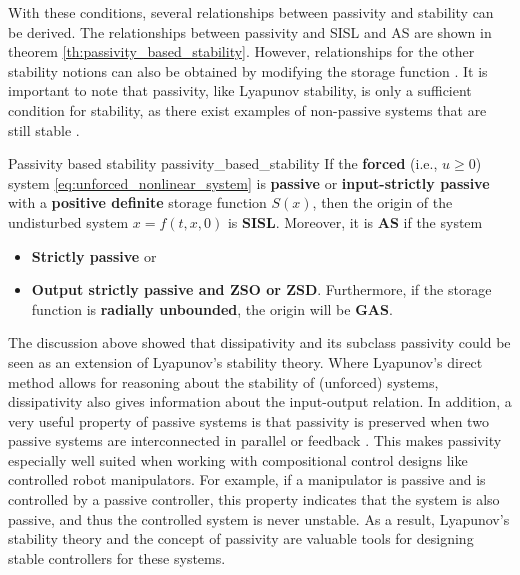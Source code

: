 With these conditions, several relationships between passivity and stability can be derived. The relationships between passivity and SISL and AS are shown in theorem \ref{th:passivity_based_stability}. However, relationships for the other stability notions can also be obtained by modifying the storage function \cite{haddadNonlinearDynamicalSystems2011}. It is important to note that passivity, like Lyapunov stability, is only a sufficient condition for stability, as there exist examples of non-passive systems that are still stable \cite{ngwompoPassivityAnalysisLinear2017}.
\begin{theorem}[list text=Passivity based stability,after pre=\footnotetext{Lemma 5.5-5.6 of \cite{khalilNonlinearControl2015} were combined and slightly adjusted for clarity.}]{Passivity based stability \cite{khalilNonlinearSystems2002}\footnotemark}{passivity_based_stability}
  If the \textbf{forced} (i.e., $u \ge 0$) system \eqref{eq:unforced_nonlinear_system} is \textbf{passive} or \textbf{input-strictly passive} with a \textbf{positive definite} storage function $S\left(x\right)$, then the origin of the undisturbed system $x=f\left(t, x, 0\right)$ is \textbf{SISL}. Moreover, it is \textbf{AS} if the system
  \begin{itemize}
    \item \textbf{Strictly passive} or
    \item \textbf{Output strictly passive and ZSO or ZSD}.
          Furthermore, if the storage function is \textbf{radially unbounded}, the origin will be \textbf{GAS}.
  \end{itemize}
\end{theorem}
The discussion above showed that dissipativity and its subclass passivity could be seen as an extension of Lyapunov's stability theory. Where Lyapunov's direct method allows for reasoning about the stability of (unforced) systems, dissipativity also gives information about the input-output relation. In addition, a very useful property of passive systems is that passivity is preserved when two passive systems are interconnected in parallel or feedback \cite{haddadNonlinearDynamicalSystems2011}. This makes passivity especially well suited when working with compositional control designs like controlled robot manipulators. For example, if a manipulator is passive and is controlled by a passive controller, this property indicates that the system is also passive, and thus the controlled system is never unstable. As a result, Lyapunov's stability theory and the concept of passivity are valuable tools for designing stable controllers for these systems.

